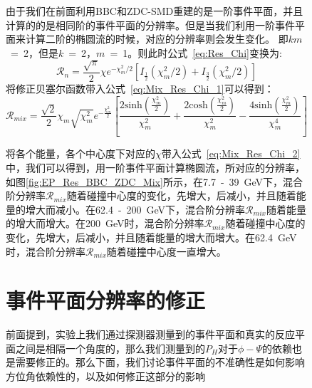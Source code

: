 \begin{figure}[htbp]
由于我们在前面利用BBC和ZDC-SMD重建的是一阶事件平面，并且计算的的是相同阶的事件平面的分辨率。但是当我们利用一阶事件平面来计算二阶的椭圆流的时候，对应的分辨率则会发生变化。
即$km$~=~2，但是$k$~=~2，$m$~=~1。则此时公式~\ref{eq:Res_Chi}变换为:
\begin{equation}
\label{eq:Mix_Res_Chi_1}
\mathcal{R}_{n} = \frac{\sqrt{\pi}}{2}\chi e^{-\chi_{m}^2/2} \left[ I_{\frac{1}{2}}(\chi_{m}^2/2) + I_{\frac{3}{2}}(\chi_{m}^2/2) \right]
\end{equation}
将修正贝塞尔函数带入公式~\ref{eq:Mix_Res_Chi_1}可以得到：
\begin{equation}
\label{eq:Mix_Res_Chi_2}
\mathcal{R}_{mix} = \frac{\sqrt{2}}{2}\chi_{m} \sqrt{\chi_{m}^2} e^{-\frac{\chi_{m}^2}{2}}  \left[ \frac{2\mathrm{sinh}(\frac{\chi_{m}^2}{2})}{\chi_{m}^2} + \frac{2\mathrm{cosh}(\frac{\chi_{m}^2}{2})}{\chi_{m}^2} - \frac{4\mathrm{sinh}(\frac{\chi_{m}^2}{2})}{\chi_{m}^4} \right]
\end{equation}

将各个能量，各个中心度下对应的$\chi$带入公式~\ref{eq:Mix_Res_Chi_2}中，我们可以得到，用一阶事件平面计算椭圆流，所对应的分辨率，如图\ref{fig:EP_Res_BBC_ZDC_Mix}所示，在7.7~-~39~GeV下，混合阶分辨率$\mathcal{R}_{mix}$随着碰撞中心度的变化，先增大，后减小，并且随着能量的增大而减小。在62.4~-~200~GeV下，混合阶分辨率$\mathcal{R}_{mix}$随着能量的增大而增大。在200~GeV时，混合阶分辨率$\mathcal{R}_{mix}$随着碰撞中心度的变化，先增大，后减小，并且随着能量的增大而增大。在62.4~GeV时，混合阶分辨率$\mathcal{R}_{mix}$随着碰撞中心度一直增大。




\section{事件平面分辨率的修正}
前面提到，实验上我们通过探测器测量到的事件平面和真实的反应平面之间是相隔一个角度的，那么我们测量到的$P_{H}$对于$\phi-\Psi$的依赖也是需要修正的。那么下面，我们讨论事件平面的不准确性是如何影响方位角依赖性的，以及如何修正这部分的影响

\end{figure}
